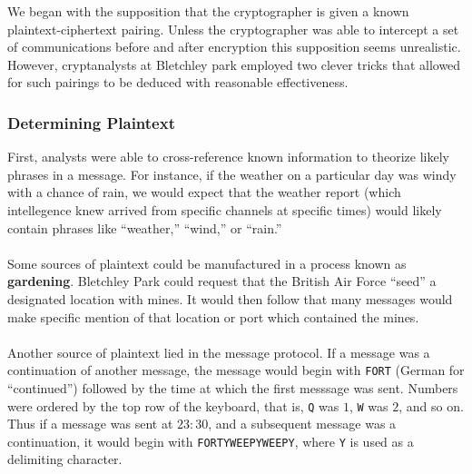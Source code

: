We began with the supposition that the
cryptographer is given a known plaintext-ciphertext pairing. Unless
the cryptographer was able to intercept
a set of communications before and after encryption this supposition
seems unrealistic. However, cryptanalysts at Bletchley park
employed two clever tricks that allowed for such pairings to be
deduced with reasonable effectiveness.
\subsubsection{Determining Plaintext}
First, analysts were able to cross-reference known information to
theorize likely phrases in a
message. For instance, if the weather on a particular day was windy
with a chance of rain, we would expect that the weather report (which
intellegence knew arrived from specific channels at specific times)
would likely contain phrases like ``weather,'' ``wind,'' or ``rain.''
\\\\Some sources of plaintext could be manufactured in a process
known as {\bf{gardening}}. Bletchley Park could request that the
British Air Force ``seed'' a designated location with mines. It would
then follow that many messages would make specific mention of that
location or port which contained the mines.
\\\\Another source of plaintext lied in the message protocol. If a
message was a continuation of another message, the message would
begin with \texttt{FORT} (German for ``continued'') followed by the
time at which the first messsage was sent. Numbers were ordered by
the top row of the keyboard, that is, \texttt{Q} was $1$, \texttt{W}
was $2$, and so on.  Thus if a message was sent at $23:30$, and a
subsequent message was a continuation, it would begin with
\texttt{FORTYWEEPYWEEPY}, where \texttt{Y} is used as a delimiting character.
